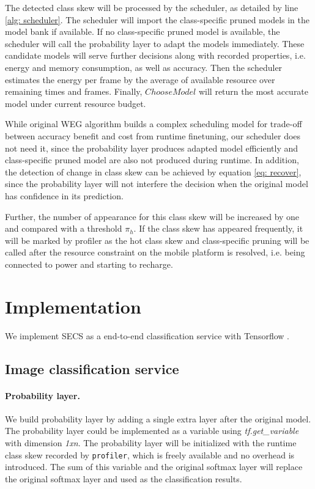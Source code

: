 \documentclass[pageno]{jpaper}
\begin{document}
The detected class skew will be processed by the scheduler, as detailed by line \ref{alg: scheduler}. The scheduler will import the class-specific pruned models in the model bank if available. If no class-specific pruned model is available, the scheduler will call the probability layer to adapt the models immediately. These candidate models will serve further decisions along with recorded properties, i.e. energy and memory consumption, as well as accuracy. Then the scheduler estimates the energy per frame by the average of available resource over remaining times and frames. Finally, $ChooseModel$ will return the most accurate model under current resource budget. 

While original WEG algorithm \cite{shen2016fast} builds a complex scheduling model for trade-off between accuracy benefit and cost from runtime finetuning, our scheduler does not need it, since the probability layer produces adapted model efficiently and class-specific pruned model are also not produced during runtime. In addition, the detection of change in class skew can be achieved by equation \ref{eq: recover}, since the probability layer will not interfere the decision when the original model has confidence in its prediction.




Further, the number of appearance for this class skew will be increased by one and compared with a threshold $\pi_h$. If the class skew has appeared frequently, it will be marked by profiler as the hot class skew and class-specific pruning will be called after the resource constraint on the mobile platform is resolved, i.e. being connected to power and starting to recharge.





\section{Implementation} \label{implementation}
We implement SECS as a end-to-end classification service with Tensorflow \cite{tensorflow2015-whitepaper}. 


\subsection{Image classification service}
\paragraph{Probability layer.}
We build probability layer by adding a single extra layer after the original model. The probability layer could be implemented as a variable using \textit{tf.get\_variable} with dimension \textit{1xn}. The probability layer will be initialized with the runtime class skew recorded by \texttt{profiler}, which is freely available and no overhead is introduced. The sum of this variable and the original softmax layer will replace the original softmax layer and used as the classification results. 
\end{document}
